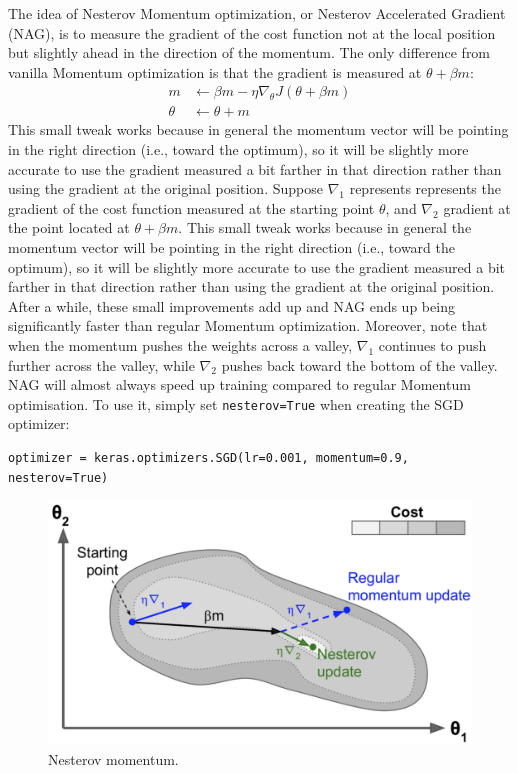 \documentclass[12pt, letterpaper]{article}
\theoremstyle{definition}
\let\cd\lstinline
\begin{document}
The idea of Nesterov Momentum optimization, or Nesterov Accelerated Gradient (NAG), is to measure the gradient of the cost function not at the local position but slightly ahead in the direction of the momentum. The only difference from vanilla Momentum optimization is that the gradient is measured at $\theta + \beta m$:
\begin{equation}
\begin{aligned}
m &\leftarrow \beta m - \eta \nabla_\theta J(\theta+\beta m)\\
\theta &\leftarrow \theta + m
\end{aligned}
\end{equation}
This small tweak works because in general the momentum vector will be pointing in the right direction (i.e., toward the optimum), so it will be slightly more accurate to use the gradient measured a bit farther in that direction rather than using the gradient at the original position. Suppose $\nabla_1$ represents represents the gradient of the cost function measured at the starting point $\theta$, and $\nabla_2$ gradient at the point located at $\theta + \beta m$. This small tweak works because in general the momentum vector will be pointing in the right direction (i.e., toward the optimum), so it will be slightly more accurate to use the gradient measured a bit farther in that direction rather than using the gradient at the original position. After a while, these small improvements add up and NAG ends up being significantly faster than regular Momentum optimization. Moreover, note that when the momentum pushes the weights across a valley, $\nabla_1$ continues to push further across the valley, while $\nabla_2$ pushes back toward the bottom of the valley. NAG will almost always speed up training compared to regular Momentum optimisation. To use it, simply set \cd+nesterov=True+ when creating the SGD optimizer:
\begin{lstlisting}
optimizer = keras.optimizers.SGD(lr=0.001, momentum=0.9, nesterov=True)
\end{lstlisting}
\begin{figure}
\centering
\includegraphics[scale=0.5]{img/nesterov}
\caption{Nesterov momentum.}
\end{figure}
\end{document}
